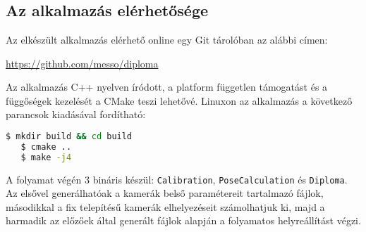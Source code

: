 \appendix
\chapter*{\fuggelek}
\setcounter{chapter}{6}  %
\setcounter{equation}{0} %

\section{Az alkalmazás elérhetősége}

Az elkészült alkalmazás elérhető online egy Git tárolóban az alábbi címen: 

\url{https://github.com/messo/diploma}

Az alkalmazás C++ nyelven íródott, a platform független támogatást és a függőségek kezelését a CMake teszi lehetővé. Linuxon az alkalmazás a következő parancsok kiadásával fordítható:

\begin{lstlisting}[language=bash,basicstyle=\ttfamily\small]
   $ mkdir build && cd build
   $ cmake ..
   $ make -j4
\end{lstlisting}

A folyamat végén 3 bináris készül: \texttt{Calibration}, \texttt{PoseCalculation} és \texttt{Diploma}. Az elsővel generálhatóak a kamerák belső paramétereit tartalmazó fájlok, másodikkal a fix telepítésű kamerák elhelyezéseit számolhatjuk ki, majd a harmadik az előzőek által generált fájlok alapján a folyamatos helyreállítást végzi.
